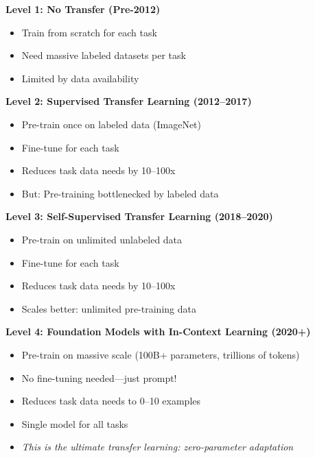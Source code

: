 \documentclass{article}
\begin{document}
\begin{tcolorbox}[colback=blue!5!white, colframe=blue!75!black, title=The Progression of Generality]

\textbf{Level 1: No Transfer (Pre-2012)}
\begin{itemize}
\item Train from scratch for each task
\item Need massive labeled datasets per task
\item Limited by data availability
\end{itemize}

\vspace{0.3cm}

\textbf{Level 2: Supervised Transfer Learning (2012--2017)}
\begin{itemize}
\item Pre-train once on labeled data (ImageNet)
\item Fine-tune for each task
\item Reduces task data needs by 10--100x
\item But: Pre-training bottlenecked by labeled data
\end{itemize}

\vspace{0.3cm}

\textbf{Level 3: Self-Supervised Transfer Learning (2018--2020)}
\begin{itemize}
\item Pre-train on unlimited unlabeled data
\item Fine-tune for each task
\item Reduces task data needs by 10--100x
\item Scales better: unlimited pre-training data
\end{itemize}

\vspace{0.3cm}

\textbf{Level 4: Foundation Models with In-Context Learning (2020+)}
\begin{itemize}
\item Pre-train on massive scale (100B+ parameters, trillions of tokens)
\item No fine-tuning needed---just prompt!
\item Reduces task data needs to 0--10 examples
\item Single model for all tasks
\item \textit{This is the ultimate transfer learning: zero-parameter adaptation}
\end{itemize}
\end{tcolorbox}
\end{document}
